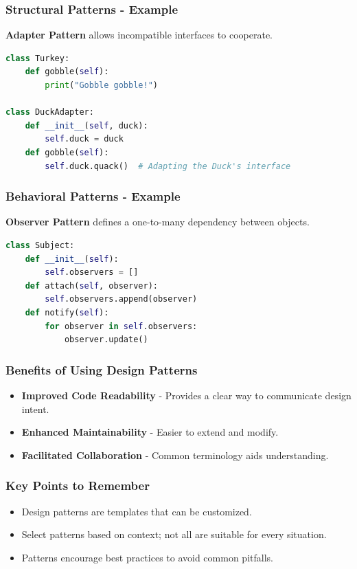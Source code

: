 \documentclass{beamer}
\begin{document}
\begin{frame}[fragile]
    \frametitle{Structural Patterns - Example}
    \textbf{Adapter Pattern} allows incompatible interfaces to cooperate.
    \begin{lstlisting}[language=Python]
class Turkey:
    def gobble(self):
        print("Gobble gobble!")
        
class DuckAdapter:
    def __init__(self, duck):
        self.duck = duck
    def gobble(self):
        self.duck.quack()  # Adapting the Duck's interface
    \end{lstlisting}
\end{frame}

\begin{frame}[fragile]
    \frametitle{Behavioral Patterns - Example}
    \textbf{Observer Pattern} defines a one-to-many dependency between objects.
    \begin{lstlisting}[language=Python]
class Subject:
    def __init__(self):
        self.observers = []
    def attach(self, observer):
        self.observers.append(observer)
    def notify(self):
        for observer in self.observers:
            observer.update()
    \end{lstlisting}
\end{frame}

\begin{frame}[fragile]
    \frametitle{Benefits of Using Design Patterns}
    \begin{itemize}
        \item \textbf{Improved Code Readability} - Provides a clear way to communicate design intent.
        \item \textbf{Enhanced Maintainability} - Easier to extend and modify.
        \item \textbf{Facilitated Collaboration} - Common terminology aids understanding.
    \end{itemize}
\end{frame}

\begin{frame}[fragile]
    \frametitle{Key Points to Remember}
    \begin{itemize}
        \item Design patterns are templates that can be customized.
        \item Select patterns based on context; not all are suitable for every situation.
        \item Patterns encourage best practices to avoid common pitfalls.
    \end{itemize}
\end{frame}
\end{document}

